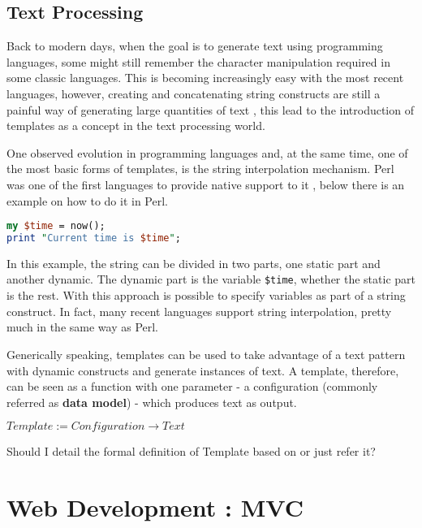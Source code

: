 \subsection{Text Processing}

Back to modern days, when the goal is to generate text using programming languages, some might still remember the character manipulation required in some classic languages. This is becoming increasingly easy with the most recent languages, however, creating and concatenating string constructs are still a painful way of generating large quantities of text \cite{Fowler2003PatternsArchitecture}, this lead to the introduction of templates as a concept in the text processing world.

One observed evolution in programming languages and, at the same time, one of the most basic forms of templates, is the string interpolation mechanism. Perl was one of the first languages to provide native support to it \cite{Wall2000ProgrammingPerl}, below there is an example on how to do it in Perl.

\begin{lstlisting}[language=Perl]
my $time = now();
print "Current time is $time";
\end{lstlisting}

In this example, the string can be divided in two parts, one static part and another dynamic. The dynamic part is the variable \texttt{\$time}, whether the static part is the rest. With this approach is possible to specify variables as part of a string construct. In fact, many recent languages support string interpolation, pretty much in the same way as Perl. 

Generically speaking, templates can be used to take advantage of a text pattern with dynamic constructs and generate instances of text. A template, therefore, can be seen as a function with one parameter - a configuration (commonly referred as \textbf{data model}) - which produces text as output. 

\begin{center}
$Template := Configuration \rightarrow Text$
\end{center}

\begin{orientador}
    Should I detail the formal definition of Template based on \cite{Parr2004EnforcingEngines} or just refer it?
\end{orientador}

\section{Web Development : MVC}

